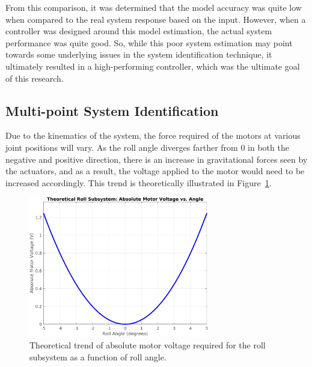 From this comparison, it was determined that the model accuracy was quite low when compared to the real system response based on the input. However, when a controller was designed around this model estimation, the actual system performance was quite good. So, while this poor system estimation may point towards some underlying issues in the system identification technique, it ultimately resulted in a high-performing controller, which was the ultimate goal of this research.


\subsection{Multi-point System Identification}

Due to the kinematics of the system, the force required of the motors at various joint positions will vary. As the roll angle diverges farther from 0 in both the negative and positive direction, there is an increase in gravitational forces seen by the actuators, and as a result, the voltage applied to the motor would need to be increased accordingly. This trend is theoretically illustrated in Figure~\ref{fig:roll_voltage_trend}.

\begin{figure}[H]
    \centering
    \includegraphics[width=0.7\textwidth]{figures/Roll_Subsystem_Theoretical_Trend.png}
    \caption{Theoretical trend of absolute motor voltage required for the roll subsystem as a function of roll angle.}
    \label{fig:roll_voltage_trend}
\end{figure}


